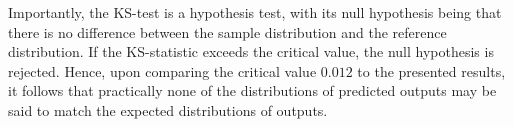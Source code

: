 \documentclass[conference]{IEEEtran}
\begin{document}
Importantly, the KS-test is a hypothesis test, with its null hypothesis being that there is no difference between the sample distribution and the reference distribution. If the KS-statistic exceeds the critical value, the null hypothesis is rejected. Hence, upon comparing the critical value $0.012$ to the presented results, it follows that practically none of the distributions of predicted outputs may be said to match the expected distributions of outputs.\\
\end{document}
